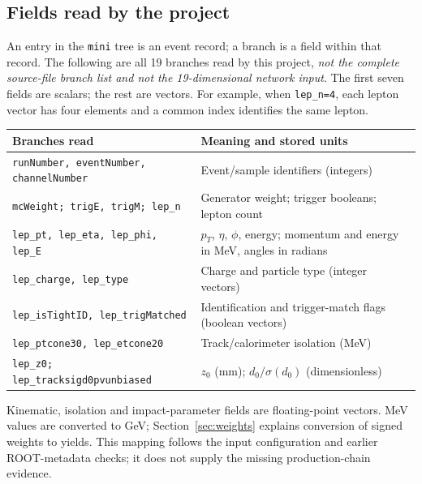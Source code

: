 \documentclass[11pt,a4paper]{article}
\begin{document}
\subsection{Fields read by the project}
An entry in the \texttt{mini} tree is an event record; a branch is a field within that record.
The following are all 19 branches read by this project, \emph{not the complete source-file branch list and not the 19-dimensional network input}.
The first seven fields are scalars; the rest are vectors.
For example, when \texttt{lep\_n=4}, each lepton vector has four elements and a common index identifies the same lepton.
\begin{center}
\small
\renewcommand{\arraystretch}{1.13}
\begin{tabularx}{\linewidth}{@{}p{.57\linewidth}Y@{}}
\toprule
Branches read & Meaning and stored units \\
\midrule
\texttt{runNumber, eventNumber, channelNumber} & Event/sample identifiers (integers) \\
\texttt{mcWeight; trigE, trigM; lep\_n} & Generator weight; trigger booleans; lepton count \\
\texttt{lep\_pt, lep\_eta, lep\_phi, lep\_E} & $p_T$, $\eta$, $\phi$, energy; momentum and energy in MeV, angles in radians \\
\texttt{lep\_charge, lep\_type} & Charge and particle type (integer vectors) \\
\texttt{lep\_isTightID, lep\_trigMatched} & Identification and trigger-match flags (boolean vectors) \\
\texttt{lep\_ptcone30, lep\_etcone20} & Track/calorimeter isolation (MeV) \\
\texttt{lep\_z0; lep\_tracksigd0pvunbiased} & $z_0$ (mm); $d_0/\sigma(d_0)$ (dimensionless) \\
\bottomrule
\end{tabularx}
\end{center}
Kinematic, isolation and impact-parameter fields are floating-point vectors.
MeV values are converted to GeV; Section~\ref{sec:weights} explains conversion of signed weights to yields.
This mapping follows the input configuration and earlier ROOT-metadata checks; it does not supply the missing production-chain evidence.
\end{document}

